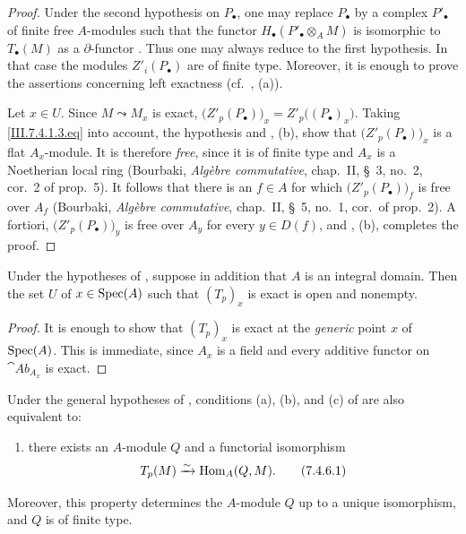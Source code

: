 \begin{proof}
Under the second hypothesis on $P_\bullet$, one may replace
$P_\bullet$ by a complex $P'_\bullet$ of finite free
$A$-modules such that the functor $H_\bullet(P'_\bullet\otimes_A M)$
is isomorphic to $T_\bullet(M)$ as a $\partial$-functor
.  Thus one may always reduce to the first
hypothesis.  In that case the modules $Z'_i(P_\bullet)$ are of
finite type.  Moreover, it is enough to prove the assertions
concerning left exactness (cf.\ , (a)).

Let $x\in U$.  Since $M\leadsto M_x$ is exact, $\bigl(Z'_p(P_\bullet)\bigr)_x
=
Z'_p\bigl((P_\bullet)_x\bigr)$.
Taking \eqref{III.7.4.1.3.eq} into account, the hypothesis and
, (b), show that
$\bigl(Z'_p(P_\bullet)\bigr)_x$ is a flat $A_x$-module.  It is
therefore \emph{free}, since it is of finite type and $A_x$ is a
Noetherian local ring (Bourbaki,
\emph{Alg\`ebre commutative}, chap.~II, \S~3, no.~2, cor.~2
of prop.~5).  It follows that there is an $f\in A$ for which
$\bigl(Z'_p(P_\bullet)\bigr)_f$ is free over $A_f$
(Bourbaki, \emph{Alg\`ebre commutative}, chap.~II, \S~5,
no.~1, cor.\ of prop.~2).  A fortiori,
$\bigl(Z'_p(P_\bullet)\bigr)_y$ is free over $A_y$ for every
$y\in D(f)$, and , (b), completes the proof.
\end{proof}

\begin{corollary}[7.4.5]
\label{III.7.4.5}
Under the hypotheses of , suppose in addition
that $A$ is an integral domain.  Then the set $U$ of
$x\in\operatorname{Spec}(A)$ such that $(T_p)_x$ is exact is open and
nonempty.
\end{corollary}

\begin{proof}
It is enough to show that $(T_p)_x$ is exact at the \emph{generic}
point $x$ of $\operatorname{Spec}(A)$.  This is immediate, since $A_x$ is a
field and every additive functor on $\cat{Ab}_{A_x}$ is exact.
\end{proof}

\begin{proposition}[7.4.6]
\label{III.7.4.6}
Under the general hypotheses of , conditions
(a), (b), and (c) \textup{of } are also equivalent to:
\begin{enumerate}
  \item[(d)] there exists an $A$-module $Q$ and a functorial
    isomorphism
    \[
      T_p(M)\xrightarrow{\sim}\operatorname{Hom}_A(Q,M).
      \tag{7.4.6.1}\label{III.7.4.6.1.eq}
    \]
\end{enumerate}
Moreover, this property determines the $A$-module $Q$ up to a
unique isomorphism, and $Q$ is of finite type.
\end{proposition}

